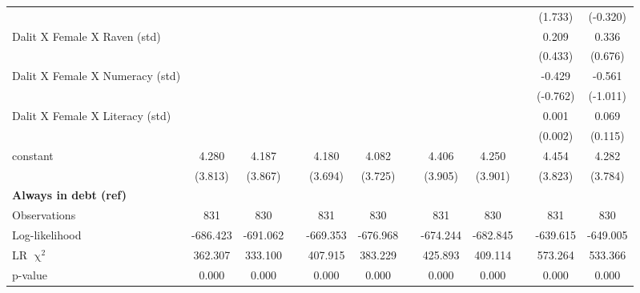 {\begin{longtable}{@{\extracolsep{\fill}}lccccccccccc}
          &       &       &       &       &       &       &       &       &       & (1.733) & (-0.320) \\
    Dalit X Female X Raven (std) &       &       &       &       &       &       &       &       &       & 0.209 & 0.336 \\
          &       &       &       &       &       &       &       &       &       & (0.433) & (0.676) \\
    Dalit X Female X Numeracy (std) &       &       &       &       &       &       &       &       &       & -0.429 & -0.561 \\
          &       &       &       &       &       &       &       &       &       & (-0.762) & (-1.011) \\
    Dalit X Female X Literacy (std) &       &       &       &       &       &       &       &       &       & 0.001 & 0.069 \\
          &       &       &       &       &       &       &       &       &       & (0.002) & (0.115) \\
    constant & 4.280 & 4.187 &       & 4.180 & 4.082 &       & 4.406 & 4.250 &       & 4.454 & 4.282 \\
          & (3.813) & (3.867) &       & (3.694) & (3.725) &       & (3.905) & (3.901) &       & (3.823) & (3.784) \\
    \midrule
    \textbf{Always in debt (ref)} &       &       &       &       &       &       &       &       &       &       &  \\
    \midrule
    Observations & 831 & 830 &   & 831 & 830 &   & 831 & 830 &   & 831 & 830 \\
    Log-likelihood & -686.423 & -691.062 &   & -669.353 & -676.968 &   & -674.244 & -682.845 &   & -639.615 & -649.005 \\
    LR $\upchi^2$ & 362.307 & 333.100 &   & 407.915 & 383.229 &   & 425.893 & 409.114 &   & 573.264 & 533.366 \\
    p-value & 0.000 & 0.000 &   & 0.000 & 0.000 &   & 0.000 & 0.000 &   & 0.000 & 0.000 \\
    \bottomrule
    \end{longtable}%
}
